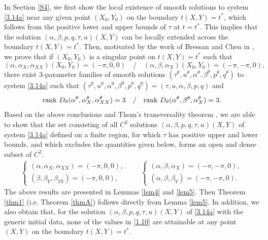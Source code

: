 \documentclass[11pt,reqno]{article}
\numberwithin{equation}{section}
\begin{document}
In Section \ref{S4}, we first show the local existence of smooth solutions to system \eqref{3.14a} near any given point $(X_0, Y_0)$ on the boundary $t(X,Y)=t^*$, which follows from the positive lower and upper bounds of $\tau$ at $t=t^*$. This implies that the solution $(\alpha, \beta, p, q, \tau, u)(X,Y)$ can be locally extended across the boundary $t(X,Y)=t^*$.
Then, motivated by the work of Bressan and Chen in \cite{BC1}, we prove that if $(X_0,Y_0)$ is a singular point on $t(X,Y)=t^*$ such that
$$
(\alpha, \alpha_X, \alpha_{XX})(X_0, Y_0)=(-\pi, 0, 0)\quad / \quad (\alpha, \beta, \alpha_{X})(X_0, Y_0)=(-\pi, -\pi, 0),
$$
there exist 3-parameter families of smooth solutions $(\tau^\theta, u^\theta, \alpha^\theta, \beta^\theta, p^\theta, q^\theta)$ to system \eqref{3.14a} such that $(\tau^0, u^0, \alpha^0, \beta^0, p^0, q^0)=(\tau, u, \alpha, \beta, p, q)$ and
$$
{\rm rank}\ D_\theta(\alpha^\theta, \alpha_{X}^\theta, \alpha_{XX}^{\theta})=3\quad / \quad {\rm rank}\ D_\theta(\alpha^\theta, \beta^\theta, \alpha_{X}^{\theta})=3.
$$
Based on the above conclusions and Thom's transversality theorem \cite{BC1, Thom}, we are able to show that the set consisting of all $C^2$ solutions $(\alpha, \beta, p, q, \tau, u)(X,Y)$ of system \eqref{3.14a} defined on a finite region, for which $\tau$ has positive upper and lower bounds, and which excludes the quantities given below, forms an open and dense subset of $C^2$.
\begin{align}\label{1.10}
\left\{
\begin{array}{r}
(\alpha, \alpha_X, \alpha_{XX})=(-\pi, 0, 0), \\
(\beta, \beta_Y, \beta_{YY})=(-\pi, 0, 0),
\end{array}
\right. \qquad
\left\{
\begin{array}{r}
(\alpha, \beta, \alpha_{X})=(-\pi, -\pi, 0), \\
(\alpha, \beta, \beta_{Y})=(-\pi, -\pi, 0).
\end{array}
\right.
\end{align}
The above results are presented in Lemmas \ref{lem4} and \ref{lem5}. Then Theorem \ref{thm1} (i.e. Theorem \ref{thmA}) follows directly from Lemma \ref{lem5}. In addition, we also obtain that, for the solution $(\alpha, \beta, p, q, \tau, u)(X,Y)$ of \eqref{3.14a} with the generic initial data,
none of the values in \eqref{1.10} are attainable at any point $(X,Y)$ on the boundary $t(X,Y)=t^*$.
\end{document}
